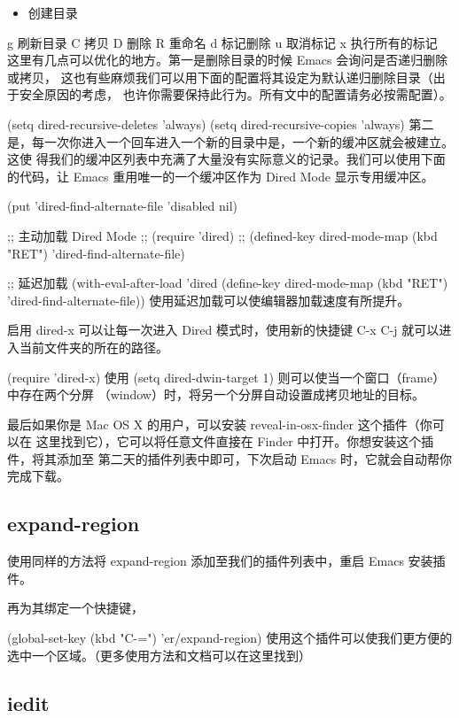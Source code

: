 \documentclass[11pt]{ctexart}
\begin{document}
\begin{itemize}
\item 创建目录
\end{itemize}
g 刷新目录
C 拷贝
D 删除
R 重命名
d 标记删除
u 取消标记
x 执行所有的标记
这里有几点可以优化的地方。第一是删除目录的时候 Emacs 会询问是否递归删除或拷贝， 这也有些麻烦我们可以用下面的配置将其设定为默认递归删除目录（出于安全原因的考虑， 也许你需要保持此行为。所有文中的配置请务必按需配置）。

(setq dired-recursive-deletes 'always)
(setq dired-recursive-copies 'always)
第二是，每一次你进入一个回车进入一个新的目录中是，一个新的缓冲区就会被建立。这使 得我们的缓冲区列表中充满了大量没有实际意义的记录。我们可以使用下面的代码，让 Emacs 重用唯一的一个缓冲区作为 Dired Mode 显示专用缓冲区。

(put 'dired-find-alternate-file 'disabled nil)

;; 主动加载 Dired Mode
;; (require 'dired)
;; (defined-key dired-mode-map (kbd "RET") 'dired-find-alternate-file)

;; 延迟加载
(with-eval-after-load 'dired
(define-key dired-mode-map (kbd "RET") 'dired-find-alternate-file))
使用延迟加载可以使编辑器加载速度有所提升。

启用 dired-x 可以让每一次进入 Dired 模式时，使用新的快捷键 C-x C-j 就可以进 入当前文件夹的所在的路径。

(require 'dired-x)
使用 (setq dired-dwin-target 1) 则可以使当一个窗口（frame）中存在两个分屏 （window）时，将另一个分屏自动设置成拷贝地址的目标。

最后如果你是 Mac OS X 的用户，可以安装 reveal-in-osx-finder 这个插件（你可以在
这里找到它），它可以将任意文件直接在 Finder 中打开。你想安装这个插件，将其添加至
第二天的插件列表中即可，下次启动 Emacs 时，它就会自动帮你完成下载。
\subsection{expand-region}
\label{sec:org5d3161e}

使用同样的方法将 expand-region 添加至我们的插件列表中，重启 Emacs 安装插件。

再为其绑定一个快捷键，

(global-set-key (kbd "C-=") 'er/expand-region)
使用这个插件可以使我们更方便的选中一个区域。（更多使用方法和文档可以在这里找到）

\subsection{iedit}
\label{sec:org74cf410}
\end{document}
